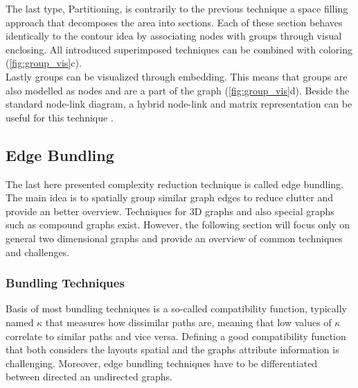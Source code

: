 The last type, Partitioning, is contrarily to the previous technique a space filling approach that decomposes the area into sections. Each of these section behaves identically to the contour idea by associating nodes with groups through visual enclosing. All introduced superimposed techniques can be combined with coloring (\autoref{fig:group_vis}c).\\
Lastly groups can be visualized through embedding. This means that groups are also modelled as nodes and are a part of the graph (\autoref{fig:group_vis}d). Beside the standard node-link diagram, a hybrid node-link and matrix representation can be useful for this technique \cite{Vehlow2015}.\\

\subsection{Edge Bundling}
The last here presented complexity reduction technique is called edge bundling. The main idea is to spatially group similar graph edges to reduce clutter and provide an better overview. Techniques for 3D graphs and also special graphs such as compound graphs exist. However, the following section will focus only on general two dimensional graphs and provide an overview of common techniques and challenges.

\subsubsection{Bundling Techniques}
Basis of most bundling techniques is a so-called compatibility function, typically named $\kappa$ that measures how dissimilar paths are, meaning that low values of $\kappa$ correlate to similar paths and vice versa. Defining a good compatibility function that both considers the layouts spatial and the graphs attribute information is challenging. Moreover, edge bundling techniques have to be differentiated between directed an undirected graphs\cite{Lhuillier2017}.


